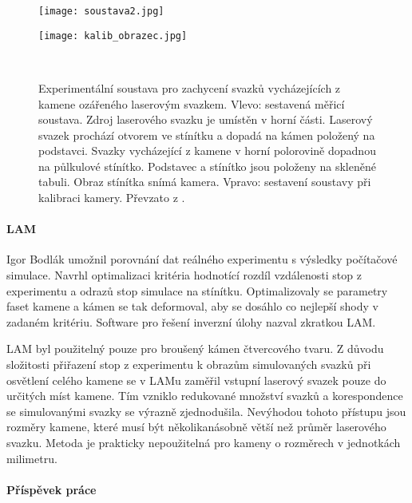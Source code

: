 \begin{figure}[h!]
    \centering
    \begin{minipage}[c]{0.50\textwidth}
        \centering\texttt{[image: soustava2.jpg]}
    \end{minipage}
    \begin{minipage}[c]{0.46\textwidth}
        \centering\texttt{[image: kalib\_obrazec.jpg]}
    \end{minipage}
    \\
        \caption[Měřicí soustava.]{Experimentální soustava pro zachycení svazků vycházejících z kamene ozářeného laserovým svazkem. Vlevo: sestavená měřicí soustava. Zdroj laserového svazku je umístěn v horní části. Laserový svazek prochází otvorem ve stínítku a dopadá na kámen položený na podstavci. Svazky vycházející z kamene v horní polorovině dopadnou na půlkulové stínítko. Podstavec a stínítko jsou položeny na skleněné tabuli. Obraz stínítka snímá kamera. Vpravo: sestavení soustavy při kalibraci kamery. Převzato z \cite{Drapela}.}
    \label{fig: merici soustava}
\end{figure}

\newpage
\paragraph{LAM}
\hspace{1mm}

Igor Bodlák \cite{Bodlak2005} umožnil porovnání dat reálného experimentu s výsledky počítačové simulace. Navrhl optimalizaci kritéria hodnotící rozdíl vzdálenosti stop z experimentu a odrazů stop simulace na stínítku. Optimalizovaly se parametry faset kamene a kámen se tak deformoval, aby se dosáhlo co nejlepší shody v zadaném kritériu. Software pro řešení inverzní úlohy nazval zkratkou LAM. 

LAM byl použitelný pouze pro broušený kámen čtvercového tvaru. Z důvodu složitosti přiřazení stop z experimentu k obrazům simulovaných svazků při osvětlení celého kamene se v LAMu zaměřil  vstupní laserový svazek pouze do určitých míst kamene. Tím vzniklo redukované množství svazků a korespondence se simulovanými svazky se výrazně zjednodušila. Nevýhodou tohoto přístupu jsou rozměry kamene, které musí být několikanásobně větší než průměr laserového svazku. Metoda je prakticky nepoužitelná pro kameny o rozměrech v jednotkách milimetru. 

\paragraph{Příspěvek práce} 
\hspace{1mm}

